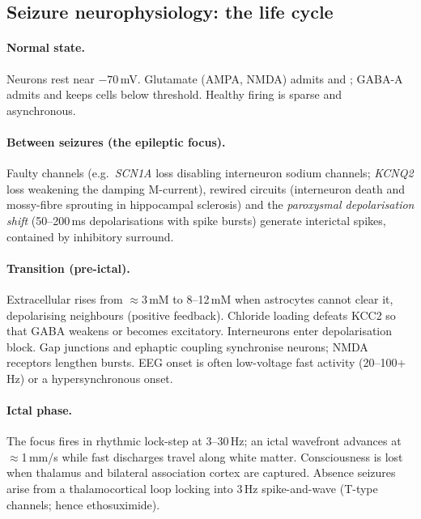 \subsection{Seizure neurophysiology: the life cycle}
\label{sec:neuro}

\paragraph{Normal state.} Neurons rest near $-70$\,mV. Glutamate (AMPA, NMDA) admits \Nap{} and \Catwo; GABA-A admits \Clm{} and keeps cells below threshold. Healthy firing is sparse and asynchronous.

\paragraph{Between seizures (the epileptic focus).} Faulty channels (e.g.\ \textit{SCN1A} loss disabling interneuron sodium channels; \textit{KCNQ2} loss weakening the damping M-current), rewired circuits (interneuron death and mossy-fibre sprouting in hippocampal sclerosis) and the \emph{paroxysmal depolarisation shift} (50--200\,ms depolarisations with spike bursts) generate interictal spikes, contained by inhibitory surround.

\paragraph{Transition (pre-ictal).} Extracellular \Kp{} rises from $\approx$3\,mM to 8--12\,mM when astrocytes cannot clear it, depolarising neighbours (positive feedback). Chloride loading defeats KCC2 so that GABA weakens or becomes excitatory. Interneurons enter depolarisation block. Gap junctions and ephaptic coupling synchronise neurons; NMDA receptors lengthen bursts. EEG onset is often low-voltage fast activity (20--100+\,Hz) or a hypersynchronous onset.

\paragraph{Ictal phase.} The focus fires in rhythmic lock-step at 3--30\,Hz; an ictal wavefront advances at $\approx$1\,mm/s while fast discharges travel along white matter. Consciousness is lost when thalamus and bilateral association cortex are captured. Absence seizures arise from a thalamocortical loop locking into 3\,Hz spike-and-wave (T-type \Catwo{} channels; hence ethosuximide).

